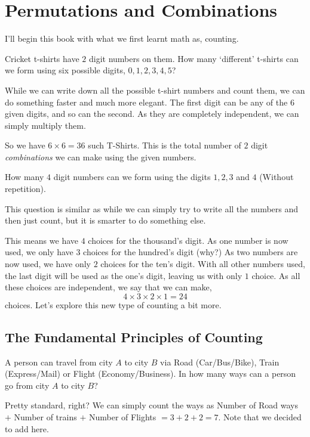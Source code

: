 \chapter{Permutations and Combinations} 

I'll begin this book with what we first learnt math as, counting.

\begin{example}
Cricket t-shirts have \(2\) digit numbers on them. How many `different' t-shirts can we form 
using six possible digits, \(0, 1, 2, 3, 4, 5\)? 
\end{example}

While we can write down all the possible t-shirt numbers and count them, we can do something 
faster and much more elegant. The first digit can be any of the \(6\) given digits, 
and so can the second. As they are completely independent, we can simply multiply them.

So we have $6 \times 6=36$ such T-Shirts. This is the total number of \(2\) digit \emph{combinations}
we can make using the given numbers.

\begin{example}
How many \(4\) digit numbers can we form using the digits \(1, 2, 3\) and \(4\) 
(Without repetition).
\end{example}
This question is similar as while we can simply try to write all the numbers and then just count, 
but it is smarter to do something else.

This means we have \(4\) choices for the thousand's digit. As one number is now used, 
we only have \(3\) choices for the hundred's digit (why?) 
As two numbers are now used, we have only \(2\) choices for the ten's digit. 
With all other numbers used, the last digit will be used as the one's digit, leaving us with only 
\(1\) choice. As all these choices are independent, we say that we can make,
\[
    4 \times 3 \times 2 \times 1 = 24
\]choices.
Let's explore this new type of counting a bit more.

\section{The Fundamental Principles of Counting}

\begin{example}
A person can travel from city \(A\) to city \(B\) via Road (Car/Bus/Bike), Train 
(Express/Mail) or Flight (Economy/Business). 
In how many ways can a person go from city \(A\) to city \(B\)?
\end{example}
Pretty standard, right? We can simply count the ways as {Number of Road ways} \(+\)
{Number of trains} \(+\) {Number of Flights} \( = 3 + 2 + 2 = 7\). Note that we decided to 
add here.

